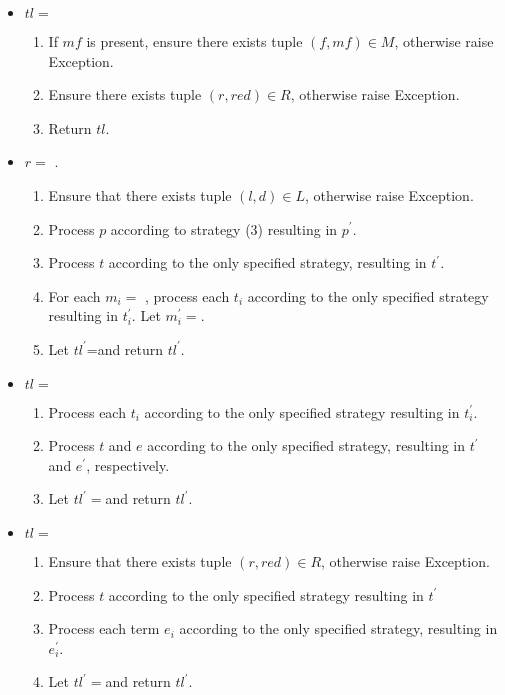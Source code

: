 \begin{itemize}
\item $tl=$ \ReadFromStdinAndApplyReductionRelation
\begin{enumerate} 
\item If $mf$ is present, ensure there exists tuple $(f, mf) \in M$, otherwise raise Exception.
\item Ensure there exists tuple $(r, red) \in R$, otherwise raise Exception.
\item Return $tl$.
\end{enumerate}


\item 
$r=$ \RedexMatchAssertEqual. 
	\begin{enumerate}
	\item Ensure that there exists tuple $(l, d) \in L$, otherwise raise Exception.
	\item Process $p$ according to strategy (3) resulting in $p^\prime$. 
	\item Process $t$ according to the only specified strategy, resulting in $t^\prime$.
	\item For each $m_i=$ \Match, process each $t_i$ according to the only specified strategy resulting in $t_i^\prime$. Let $m_i^\prime=$\Match[$s_1$][$t_1^\prime$][$s_n$][$t_n^\prime$][false].
	\item Let $tl^\prime$=\RedexMatchAssertEqual[$l$][$p^\prime$][$t^\prime$][$m_1^\prime$][$m_n^\prime$][false] and return $tl^\prime$.
	\end{enumerate}

\item $tl=$ \TermLetAssertEqual
	\begin{enumerate}
	\item  Process each $t_i$ according to the only specified strategy resulting in $t_i^\prime$.
	\item Process $t$ and $e$ according to the only specified strategy, resulting in $t^\prime$ and $e^\prime$, respectively.
	\item Let $tl^\prime=$\TermLetAssertEqual[$v_1$][$n_1$][$t_1^\prime$][$v_m$][$n_m$][$t_m^\prime$][$t^\prime$][$e^\prime$][false] and return $tl^\prime$.
	\end{enumerate}

\item $tl=$ \ApplyReductionRelationAssertEqual
	\begin{enumerate}
	\item Ensure that there exists tuple $(r, red) \in R$, otherwise raise Exception.
	\item Process $t$ according to the only specified strategy resulting in $t^\prime$
	\item Process each term $e_i$ according to the only specified strategy, resulting in $e_i^\prime$.
	\item Let $tl^\prime=$\ApplyReductionRelationAssertEqual[$r$][$t^\prime$][$e_1^\prime$][$e_n^\prime$][false] and return $tl^\prime$.
	\end{enumerate}
\end{itemize}

